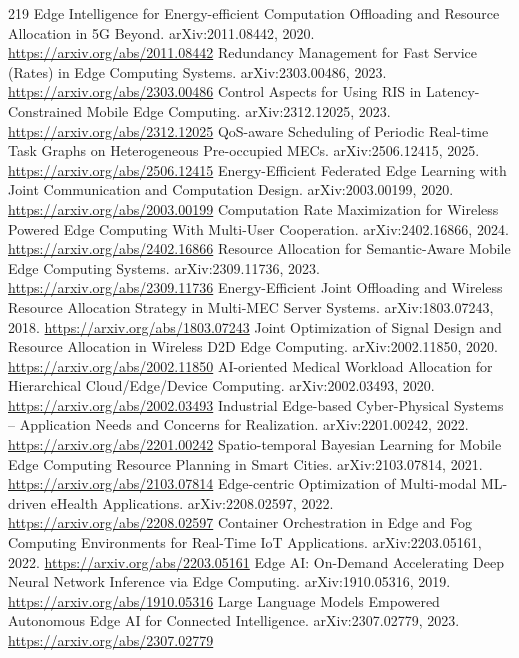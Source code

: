\documentclass[11pt]{article}
\begin{document}
\begin{thebibliography}{219}
 Edge Intelligence for Energy-efficient Computation Offloading and Resource Allocation in 5G Beyond. arXiv:2011.08442, 2020. \url{https://arxiv.org/abs/2011.08442}
 Redundancy Management for Fast Service (Rates) in Edge Computing Systems. arXiv:2303.00486, 2023. \url{https://arxiv.org/abs/2303.00486}
 Control Aspects for Using RIS in Latency-Constrained Mobile Edge Computing. arXiv:2312.12025, 2023. \url{https://arxiv.org/abs/2312.12025}
 QoS-aware Scheduling of Periodic Real-time Task Graphs on Heterogeneous Pre-occupied MECs. arXiv:2506.12415, 2025. \url{https://arxiv.org/abs/2506.12415}
 Energy-Efficient Federated Edge Learning with Joint Communication and Computation Design. arXiv:2003.00199, 2020. \url{https://arxiv.org/abs/2003.00199}
 Computation Rate Maximization for Wireless Powered Edge Computing With Multi-User Cooperation. arXiv:2402.16866, 2024. \url{https://arxiv.org/abs/2402.16866}
 Resource Allocation for Semantic-Aware Mobile Edge Computing Systems. arXiv:2309.11736, 2023. \url{https://arxiv.org/abs/2309.11736}
 Energy-Efficient Joint Offloading and Wireless Resource Allocation Strategy in Multi-MEC Server Systems. arXiv:1803.07243, 2018. \url{https://arxiv.org/abs/1803.07243}
 Joint Optimization of Signal Design and Resource Allocation in Wireless D2D Edge Computing. arXiv:2002.11850, 2020. \url{https://arxiv.org/abs/2002.11850}
 AI-oriented Medical Workload Allocation for Hierarchical Cloud/Edge/Device Computing. arXiv:2002.03493, 2020. \url{https://arxiv.org/abs/2002.03493}
 Industrial Edge-based Cyber-Physical Systems -- Application Needs and Concerns for Realization. arXiv:2201.00242, 2022. \url{https://arxiv.org/abs/2201.00242}
 Spatio-temporal Bayesian Learning for Mobile Edge Computing Resource Planning in Smart Cities. arXiv:2103.07814, 2021. \url{https://arxiv.org/abs/2103.07814}
 Edge-centric Optimization of Multi-modal ML-driven eHealth Applications. arXiv:2208.02597, 2022. \url{https://arxiv.org/abs/2208.02597}
 Container Orchestration in Edge and Fog Computing Environments for Real-Time IoT Applications. arXiv:2203.05161, 2022. \url{https://arxiv.org/abs/2203.05161}
 Edge AI: On-Demand Accelerating Deep Neural Network Inference via Edge Computing. arXiv:1910.05316, 2019. \url{https://arxiv.org/abs/1910.05316}
 Large Language Models Empowered Autonomous Edge AI for Connected Intelligence. arXiv:2307.02779, 2023. \url{https://arxiv.org/abs/2307.02779}

\end{thebibliography}
\end{document}
